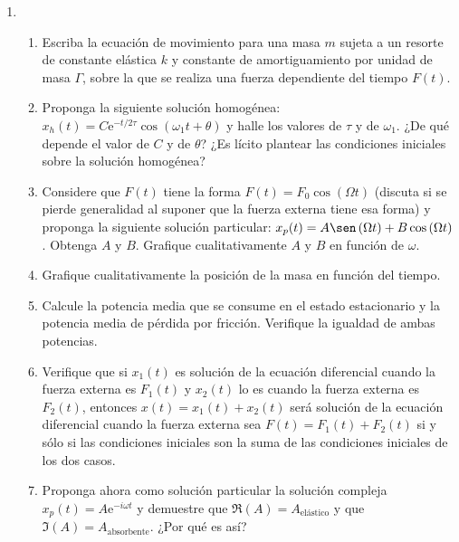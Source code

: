\documentclass[11pt,spanish,a4paper]{article}
\begin{document}
\begin{enumerate}
\item%
\begin{enumerate}
	\item Escriba la ecuación de movimiento para una masa $m$ sujeta a un resorte de constante elástica $k$ y constante de amortiguamiento por unidad de masa $\Gamma$, sobre la que se realiza una fuerza dependiente del tiempo $F(t)$. 
	\item Proponga la siguiente solución homogénea: $x_{h}(t)=C\mathrm{e}^{-t/2\tau}\cos\left(\omega_{1}t+\theta\right)$ y halle los valores de $\tau$ y de $\omega_{1}$.
	¿De qué depende el valor de $C$ y de $\theta$?
	¿Es lícito plantear las condiciones iniciales sobre la solución homogénea? 
 \item Considere que $F(t)$ tiene la forma $F(t)=F_{0}\cos\left(\Omega t\right)$ (discuta si se pierde generalidad al suponer que la fuerza externa tiene esa forma) y proponga la siguiente solución particular: $x_{p}(t)=A\sen\left(\Omega t\right)+B\cos\left(\Omega t\right)$.
Obtenga $A$ y $B$. Grafique cualitativamente $A$ y $B$ en función de $\omega$. 
	\item Grafique cualitativamente la posición de la masa en función del tiempo. 
	\item Calcule la potencia media que se consume en el estado estacionario y la potencia media de pérdida por fricción.
	Verifique la igualdad de ambas potencias. 
 \item Verifique que si $x_1(t)$ es solución de la ecuación diferencial cuando la fuerza externa es $F_1(t)$ y $x_2(t)$ lo es cuando la fuerza externa es $F_2(t)$, entonces $x(t)=x_1(t)+x_2(t)$ será solución de la ecuación diferencial cuando la fuerza externa sea $F(t)=F_1(t)+F_2(t)$ si y sólo si las condiciones iniciales son la suma de las condiciones iniciales de los dos casos. 
	\item Proponga ahora como solución particular la solución compleja $x_p(t)=A \mathrm{e}^{-i \omega t}$ y demuestre que $\Re (A)=A_\text{elástico}$ y que $\Im (A)= A_\mathrm{absorbente}$.
	¿Por qué es así?
\end{enumerate}




\end{enumerate}
\end{document}
